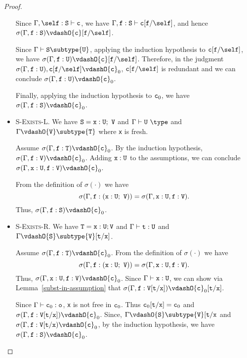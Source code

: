\begin{proof}
\begin{itemize}
Since
$\Gamma, \self: {\tt S} \vdash {\tt c}$,
we have
$\Gamma, {\tt f}: {\tt S} \vdash {\tt c}[{\tt f}/\self]$,
and hence
$\sigma(\Gamma, {\tt f}: {\tt S}) \vdashO {\tt c}[{\tt f}/\self]$.

Since 
$\Gamma \vdash {\tt S} \subtype {\tt U}$,
applying the induction hypothesis to ${\tt c}[{\tt f}/\self]$, we have
$\sigma(\Gamma, {\tt f}: {\tt U}) \vdashO {\tt c}[{\tt f}/\self]$.
%
Therefore, in the judgment
$\sigma(\Gamma, {\tt f}: {\tt U}), {\tt c}[{\tt f}/\self] \vdashO {\tt c}_0$,
${\tt c}[{\tt f}/\self]$ is redundant and we can conclude
    $\sigma(\Gamma, {\tt f}: {\tt U}) \vdashO {\tt c}_0$.

Finally,
applying the induction hypothesis to ${\tt c}_0$, we have
$\sigma(\Gamma,{\tt f}: {\tt S}) \vdashO {\tt c}_0$.

\item \textsc{S-Exists-L}.
We have
${\tt S} = {\tt x}: {\tt U};~{\tt V}$
    and
    $\Gamma \vdash {\tt U}~\type$
    and
    $\Gamma \vdashO {\tt V} \subtype {\tt T}$
    where {\tt x} is fresh.

Assume $\sigma(\Gamma,{\tt f}: {\tt T}) \vdashO {\tt c}_0$.
%
By the induction hypothesis,
$\sigma(\Gamma,{\tt f}: {\tt V}) \vdashO {\tt c}_0$.
%
Adding ${\tt x}: {\tt U}$ to the assumptions,
we can conclude
$\sigma(\Gamma, {\tt x}: {\tt U}, {\tt f}: {\tt V}) \vdashO {\tt c}_0$.

From the definition of $\sigma(\cdot)$ we have
    $$\sigma(\Gamma,{\tt f}: ({\tt x}: {\tt U};~{\tt V})) =
      \sigma(\Gamma, {\tt x}: {\tt U}, {\tt f}: {\tt V}).$$
%
Thus,
$\sigma(\Gamma,{\tt f}: {\tt S}) \vdashO {\tt c}_0$.

\item \textsc{S-Exists-R}.
We have
${\tt T} = {\tt x}: {\tt U}; {\tt V}$
    and
    $\Gamma \vdash {\tt t}: {\tt U}$
    and
    $\Gamma \vdashO {\tt S} \subtype {\tt V}[{\tt t}/{\tt x}]$.

Assume
$\sigma(\Gamma,{\tt f}: {\tt T}) \vdashO {\tt c}_0$.
%
From the definition of $\sigma(\cdot)$ we have
    $$\sigma(\Gamma,{\tt f}: ({\tt x}: {\tt U};~{\tt V})) =
      \sigma(\Gamma, {\tt x}: {\tt U}, {\tt f}: {\tt V}).$$
%
Thus,
$\sigma(\Gamma, {\tt x}: {\tt U}, {\tt f}: {\tt V}) \vdashO {\tt c}_0$.
Since
$\Gamma \vdash {\tt x}: {\tt U}$, we can show via Lemma~\ref{subst-in-assumption} that
$\sigma(\Gamma, {\tt f}: {\tt V[{\tt t}/{\tt x}]}) \vdashO {\tt c}_0[{\tt t}/{\tt x}]$.

Since $\Gamma \vdash {\tt c}_0 : {\tt o}$, {\tt x} is not free in ${\tt c}_0$.
Thus ${\tt c}_0[{\tt t}/{\tt x}] = {\tt c}_0$
and
$\sigma(\Gamma, {\tt f}: {\tt V[{\tt t}/{\tt x}]}) \vdashO {\tt c}_0$.
%
Since,
$\Gamma \vdashO {\tt S} \subtype {\tt V}[{\tt t}/{\tt x}$
and
$\sigma(\Gamma, {\tt f}: {\tt V[{\tt t}/{\tt x}}) \vdashO {\tt c}_0$,
by the induction hypothesis, we have
$\sigma(\Gamma, {\tt f}: {\tt S}) \vdashO {\tt c}_0$.
\end{itemize}
\end{proof}

